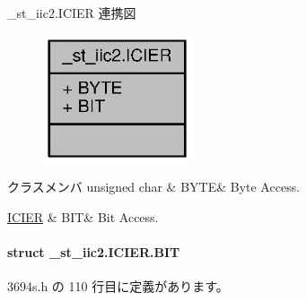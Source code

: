 \+\_\+st\+\_\+iic2.\+I\+C\+I\+E\+R 連携図
\nopagebreak
\begin{figure}[H]
\begin{center}
\leavevmode
\includegraphics[width=124pt]{d5/dca/union__st__iic2_8ICIER__coll__graph}
\end{center}
\end{figure}
\begin{DoxyFields}{クラスメンバ}
unsigned char\label{3694s_8h_ae409eb2ba6eb6801f52763ae370c350e}
&
B\+Y\+T\+E&
Byte Access. \\
\hline

\hyperlink{3694s_8h_da/d6c/struct__st__iic2_8ICIER_8BIT}{I\+C\+I\+E\+R}\label{3694s_8h_adb957fdc8000e1eef04a243f5199aa52}
&
B\+I\+T&
Bit Access. \\
\hline

\end{DoxyFields}
\label{struct__st__iic2_8ICIER_8BIT}
\paragraph{struct \+\_\+st\+\_\+iic2.\+I\+C\+I\+E\+R.\+B\+I\+T}


 3694s.\+h の 110 行目に定義があります。



